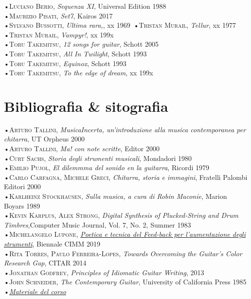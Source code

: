 \documentclass[oneside]{article}
\begin{document}
\begin{multicols*}{2}
•\textsc{\textsf {Luciano Berio}}, \emph{Sequenza XI}, Universal Edition 1988\\
•\textsc{\textsf {Maurizio Pisati}}, \emph{Set7}, Kairos 2017\\
•\textsc{\textsf {Sylvano Bussotti}}, \emph{Ultima rara,}, xx 1969\
•\textsc{\textsf {Tristan Murail}}, \emph{Tellur}, xx 1977\\
•\textsc{\textsf {Tristan Murail}}, \emph{Vampyr!}, xx 199x\\
•\textsc{\textsf {Toru Takemitsu}}, \emph{12 songs for guitar}, Schott 2005\\
•\textsc{\textsf {Toru Takemitsu}}, \emph{All In Twilight}, Schott 1993\\
•\textsc{\textsf {Toru Takemitsu}}, \emph{Equinox}, Schott 1993\\
•\textsc{\textsf {Toru Takemitsu}}, \emph{To the edge of dream}, xx 199x\\


\vfill\null
\columnbreak


\section{ Bibliografia \& sitografia}
•\textsc{\textsf {Arturo Tallini}}, \emph{MusicaIncerta, un'introduzione alla musica contemporanea per chitarra}, UT Orpheus 2000\\
•\textsc{\textsf {Arturo Tallini}}, \emph{Ma! con note scritte}, Editor 2000\\
•\textsc{\textsf {Curt Sachs}}, \emph{Storia degli strumenti musicali}, Mondadori 1980\\
•\textsc{\textsf {Emilio Pujol}}, \emph{El dilemmma del sonido en la guitarra}, Ricordi 1979\\
•\textsc{\textsf {Carlo Carfagna, Michele Greci}}, \emph{Chitarra, storia e immagini}, Fratelli Palombi Editori 2000\\
•\textsc{\textsf {Karlheinz Stockhausen}}, \emph{Sulla musica, a cura di Robin Maconie}, Marion Boyars 1989\\
•\textsc{\textsf {Kevin Karplus, Alex Strong}}, \emph{Digital Synthesis of Plucked-String and Drum Timbres},Computer Music Journal, Vol. 7, No. 2,
Summer 1983\\
•\textsc{\textsf {Michelangelo Lupone}}, \emph{\href{https://www.youtube.com/watch?v=btioUhxSoCM}{Poetica e tecnica del Feed-back per l’aumentazione degli strumenti}}, Biennale CIMM 2019\\
•\textsc{\textsf {Rita Torres, Paulo Ferreira-Lopes}}, \emph{Towards Overcoming the Guitar's Color Research Gap}, CITAR 2014\\
•\textsc{\textsf {Jonathan Godfrey}}, \emph{Principles of Idiomatic Guitar Writing},  2013\\
•\textsc{\textsf {John Schneider}}, \emph{The Contemporary Guitar},  University of California Press 1985\\
•\emph{\href{https://github.com/SMERM/BN-Tedesco/tree/master/COME-02}{Materiale del corso}}


\end{multicols*}
\end{document}
